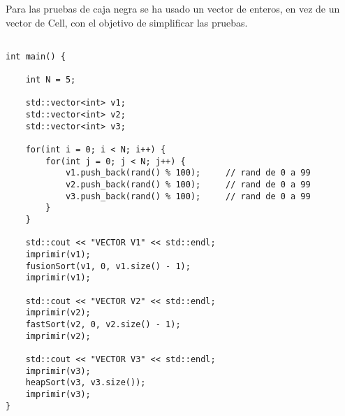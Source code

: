 Para las pruebas de caja negra se ha usado un vector de enteros, en vez de un vector de Cell, con el objetivo de simplificar las pruebas.

\begin{lstlisting}

int main() {

    int N = 5;

    std::vector<int> v1;
    std::vector<int> v2;
    std::vector<int> v3;

    for(int i = 0; i < N; i++) {
        for(int j = 0; j < N; j++) {
            v1.push_back(rand() % 100);     // rand de 0 a 99
            v2.push_back(rand() % 100);     // rand de 0 a 99
            v3.push_back(rand() % 100);     // rand de 0 a 99
        }
    }

    std::cout << "VECTOR V1" << std::endl;
    imprimir(v1);
    fusionSort(v1, 0, v1.size() - 1);
    imprimir(v1);

    std::cout << "VECTOR V2" << std::endl;
    imprimir(v2);
    fastSort(v2, 0, v2.size() - 1);
    imprimir(v2);

    std::cout << "VECTOR V3" << std::endl;
    imprimir(v3);
    heapSort(v3, v3.size());
    imprimir(v3);
}

\end{lstlisting}